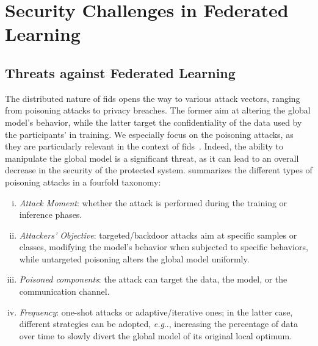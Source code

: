\documentclass[conference]{IEEEtran}
\makeatletter
\DeclareRobustCommand\onedot{\futurelet\@let@token\@onedot}
\def\@onedot{\ifx\@topicslet@token.\else.\null\fi\xspace}
\def\eg{\emph{e.g}\onedot} \def\Eg{\emph{E.g}\onedot}
\makeatother
\begin{document}
\section{Security Challenges in Federated Learning} %
\label{sec:threats}

\subsection{Threats against Federated Learning}

The distributed nature of \gls{fids} opens the way to various attack vectors, ranging from poisoning attacks to privacy breaches.
The former aim at altering the global model's behavior, while the latter target the confidentiality of the data used by the participants' in training.
We especially focus on the poisoning attacks, as they are particularly relevant in the context of \gls{fids}~\cite{lavaur_icdcs_demo}.
Indeed, the ability to manipulate the global model is a significant threat, as it can lead to an overall decrease in the security of the protected system.
\citet{rodriguez-barroso_survey_2023} summarizes the different types of poisoning attacks in a fourfold taxonomy:

\begin{enumerate}[(i)]
\item \emph{Attack Moment}: whether the attack is performed during the training or inference phases.

\item \emph{Attackers' Objective}: targeted/backdoor attacks aim at specific samples or classes, modifying the model's behavior when subjected to specific behaviors, while untargeted poisoning alters the global model uniformly.

\item \emph{Poisoned components}: the attack can target the data, the model, or the communication channel.

\item \emph{Frequency}: one-shot attacks or adaptive/iterative ones; in the latter case, different strategies can be adopted, \eg, increasing the percentage of data over time to slowly divert the global model of its original local optimum.
\end{enumerate}


\end{document}
